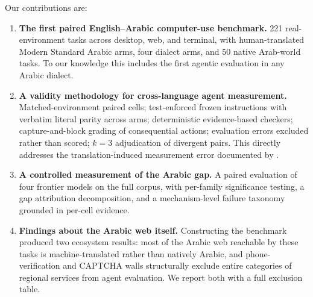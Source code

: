 Our contributions are:
\begin{enumerate}
    \item \textbf{The first paired English--Arabic computer-use benchmark.} 221
    real-environment tasks across desktop, web, and terminal, with
    human-translated Modern Standard Arabic arms, four dialect arms, and 50
    native Arab-world tasks. To our knowledge this includes the first agentic
    evaluation in any Arabic dialect.
    \item \textbf{A validity methodology for cross-language agent measurement.}
    Matched-environment paired cells; test-enforced frozen instructions with
    verbatim literal parity across arms; deterministic evidence-based checkers;
    capture-and-block grading of consequential actions; evaluation errors
    excluded rather than scored; $k{=}3$ adjudication of divergent pairs. This
    directly addresses the translation-induced measurement error documented by
    \citet{kim2026lilt}.
    \item \textbf{A controlled measurement of the Arabic gap.} A paired
    evaluation of four frontier models on the full corpus, with per-family
    significance testing, a gap attribution decomposition, and a
    mechanism-level failure taxonomy grounded in per-cell evidence.
    \item \textbf{Findings about the Arabic web itself.} Constructing the
    benchmark produced two ecosystem results: most of the Arabic web reachable
    by these tasks is machine-translated rather than natively Arabic, and
    phone-verification and CAPTCHA walls structurally exclude entire categories
    of regional services from agent evaluation. We report both with a full
    exclusion table.
\end{enumerate}
